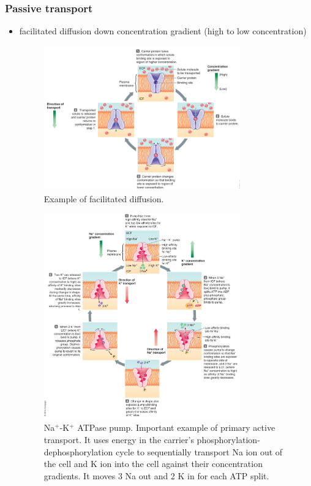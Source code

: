\documentclass[10pt]{article}
\begin{document}
\subsubsection{Passive transport}
\begin{itemize}
    \item facilitated diffusion down concentration gradient (high to low concentration)
        \begin{figure}[h]
            \centering
            \includegraphics[width=0.8\textwidth]{facilitatedDiffusion}
            \caption{Example of facilitated diffusion.}
            \label{fig:facilitatedDiffusion}
        \end{figure}
        \begin{figure}[h]
            \centering
            \includegraphics[width=0.8\textwidth]{NaKPump}
            \caption{Na$^+$-K$^+$ ATPase pump. Important example of primary active transport. It uses energy in the carrier's phosphorylation-dephosphorylation cycle to sequentially transport Na ion out of the cell and K ion into the cell against their concentration gradients. It moves 3 Na out and 2 K in for each ATP split.}
            \label{fig:NaKPump}
        \end{figure}
\end{itemize}
\end{document}
